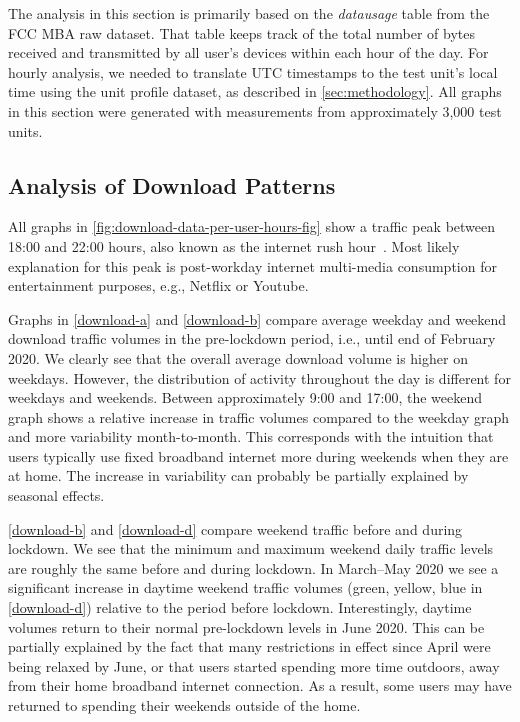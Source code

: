 The analysis in this section is primarily based on the \emph{datausage} table from the \gls{FCC} \gls{MBA} raw dataset. That table keeps track of the total number of bytes received and transmitted by all user's devices within each hour of the day. For hourly analysis, we needed to translate \gls{UTC} timestamps to the test unit's local time using the unit profile dataset, as described in \cref{sec:methodology}. All graphs in this section were generated with measurements from approximately 3,000 test units.

\subsection{Analysis of Download Patterns}\label{sec:analysis-of-download-patterns}

All graphs in \cref{fig:download-data-per-user-hours-fig} show a traffic peak between 18:00 and 22:00 hours, also known as the internet rush hour~\cite{internetrushhour}. Most likely explanation for this peak is post-workday internet multi-media consumption for entertainment purposes, e.g., Netflix or Youtube.

Graphs in \cref{download-a} and \cref{download-b} compare average weekday and weekend download traffic volumes in the pre-lockdown period, i.e., until end of February 2020. We clearly see that the overall average download volume is higher on weekdays. However, the distribution of activity throughout the day is different for weekdays and weekends. Between approximately 9:00 and 17:00, the weekend graph shows a relative increase in traffic volumes compared to the weekday graph and more variability month-to-month. This corresponds with the intuition that users typically use fixed broadband internet more during weekends when they are at home. The increase in variability can probably be partially explained by seasonal effects.

\cref{download-b} and \cref{download-d} compare weekend traffic before and during lockdown. We see that the minimum and maximum weekend daily traffic levels are roughly the same before and during lockdown. In March--May 2020 we see a significant increase in daytime weekend traffic volumes (green, yellow, blue in \cref{download-d}) relative to the period before lockdown. Interestingly, daytime volumes return to their normal pre-lockdown levels in June 2020. This can be partially explained by the fact that many restrictions in effect since April were being relaxed by June, or that users started spending more time outdoors, away from their home broadband internet connection. As a result, some users may have returned to spending their weekends outside of the home. %

